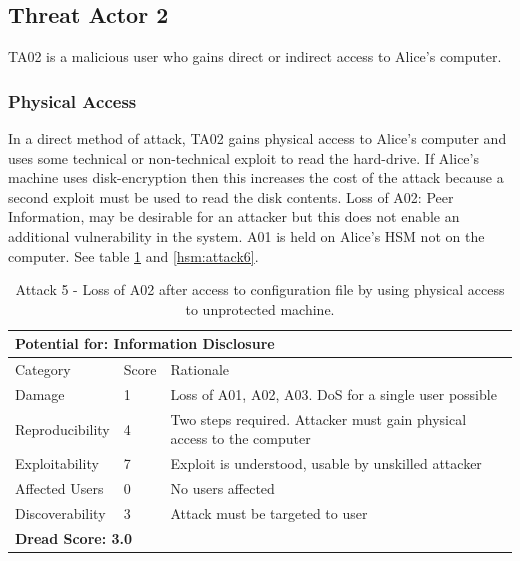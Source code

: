 \documentclass [11pt, proquest] {uwthesis}[2020/02/24]
\begin{document}
\subsection{Threat Actor 2}
TA02 is a malicious user who gains direct or indirect access to Alice's computer. 

\subsubsection{Physical Access}
In a direct method of attack, TA02 gains physical access to Alice's computer and uses some technical or non-technical exploit to read the hard-drive. If Alice's machine uses disk-encryption then this increases the cost of the attack because a second exploit must be used to read the disk contents.
Loss of A02: Peer Information, may be desirable for an attacker but this does not enable an additional vulnerability in the system.
A01 is held on Alice's HSM not on the computer.
See table \ref{hsm:attack5} and \ref{hsm:attack6}.

\begin{table}[H]
\begin{tabular}{|m{3cm}|m{.9cm}|p{27em} |}
\multicolumn{3}{l}{Potential for: Information Disclosure}   \\
\hline
Category & Score & Rationale \\
\hline
Damage          & 1     & Loss of A01, A02, A03. DoS for a single user possible   \\
\hline
Reproducibility & 4     & Two steps required. Attacker must gain physical access to the computer \\
\hline
Exploitability & 7      & Exploit is understood, usable by unskilled attacker \\
\hline
Affected Users  & 0     &  No users affected   \\
\hline
Discoverability & 3     & Attack must be targeted to user \\
\hline
\multicolumn{3}{l}{\textbf{Dread Score: 3.0}} 
\end{tabular}
\caption{Attack 5 - Loss of A02 after access to configuration file by using physical access to unprotected machine.}
\label{hsm:attack5}
\end{table}
\end{document}
